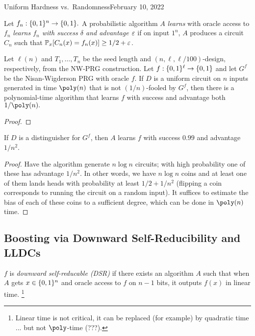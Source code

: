\begin{lecture}{4}{Uniform Hardness vs.\ Randomness}{February 10, 2022}

\begin{definition}
  Let $f_n : \{0, 1\}^n \to \{0, 1\}.$ A probabilistic algorithm $A$
  \emph{learns} with oracle access to $f_n$ \emph{learns $f_n$ with success
  $\delta$ and advantage $\varepsilon$} if on input $1^n$, $A$ produces a circuit
  $C_n$ such that $\mathbb{P}_x [C_n(x) = f_n(x)] \geq 1/2 + \varepsilon$.
\end{definition}

\begin{proposition}
  Let $\ell(n)$ and $T_1, \dots, T_n$ be the seed length and $(n, \ell,
  \ell/100)$-design, respectively, from the NW-PRG construction. Let $f :
  \{0,1\}^\ell \to \{0, 1\}$ and let $G^f$ be the Nisan-Wigderson PRG with
  oracle $f$. If $D$ is a uniform circuit on $n$ inputs generated in time
  $\poly(n)$ that is not $(1/n)$-fooled by $G^f$, then there is a
  polynomial-time algorithm that learns $f$ with success and advantage both
  $1/\poly(n).$
\end{proposition}

\begin{proof}
\end{proof}

\begin{proposition}
	If $D$ is a distinguisher for $G^{f}$, then $A$ learns $f$ with success
	$0.99$ and advantage $1/n^2$.
\end{proposition}

\begin{proof}
  Have the algorithm generate $n \log{n}$ circuits; with high probability one
  of these has advantage $1/n^2$. In other words, we have $n \log{n}$ coins and
  at least one of them lands heads with probability at least $1/2 + 1/n^2$
  (flipping a coin corresponds to running the circuit on a random input). It
  suffices to estimate the bias of each of these coins to a sufficient degree,
  which can be done in $\poly(n)$ time.
\end{proof}

\subsection{Boosting via Downward Self-Reducibility and LLDCs}

\begin{definition}
  $f$ is \emph{downward self-reducable (DSR)} if there exists an algorithm $A$
  such that when $A$ gets $x \in \{0, 1\}^n$ and oracle access to $f$ on $n -
  1$ bits, it outputs $f(x)$ in linear time.%
  \footnote{Linear time is not critical, it can be replaced (for example) by quadratic time ... but not $\poly$-time (???).}
\end{definition}


\end{lecture}
